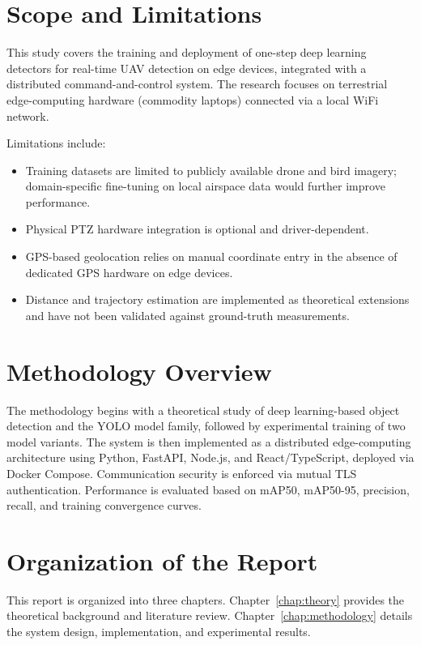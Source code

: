 \documentclass[12pt,a4paper]{report}
\begin{document}
\section{Scope and Limitations}

This study covers the training and deployment of one-step deep learning detectors
for real-time UAV detection on edge devices, integrated with a distributed
command-and-control system. The research focuses on terrestrial edge-computing
hardware (commodity laptops) connected via a local WiFi network.

Limitations include:
\begin{itemize}
  \item Training datasets are limited to publicly available drone and bird imagery;
  domain-specific fine-tuning on local airspace data would further improve performance.
  \item Physical PTZ hardware integration is optional and driver-dependent.
  \item GPS-based geolocation relies on manual coordinate entry in the absence of
  dedicated GPS hardware on edge devices.
  \item Distance and trajectory estimation are implemented as theoretical extensions
  and have not been validated against ground-truth measurements.
\end{itemize}

\section{Methodology Overview}

The methodology begins with a theoretical study of deep learning-based object
detection and the YOLO model family, followed by experimental training of two
model variants. The system is then implemented as a distributed edge-computing
architecture using Python, FastAPI, Node.js, and React/TypeScript, deployed via
Docker Compose. Communication security is enforced via mutual TLS authentication.
Performance is evaluated based on mAP50, mAP50-95, precision, recall, and
training convergence curves.

\section{Organization of the Report}

This report is organized into three chapters. Chapter~\ref{chap:theory} provides
the theoretical background and literature review. Chapter~\ref{chap:methodology}
details the system design, implementation, and experimental results.
\end{document}
